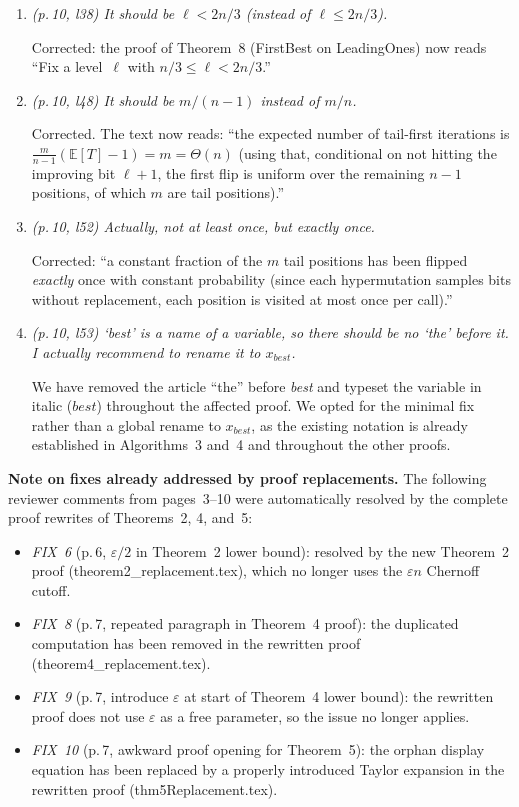 \documentclass[11pt]{article}
\newcommand{\RC}[1]{\textcolor{revcolor}{\textit{#1}}}
\newcommand{\resp}[1]{\smallskip\noindent #1\medskip}
\begin{document}
\begin{enumerate}[label=\textbf{P\arabic*.},leftmargin=*]
\item \RC{(p.\,10, l38) It should be $\ell<2n/3$ (instead of $\ell\le 2n/3$).}

\resp{Corrected: the proof of Theorem~8 (FirstBest on LeadingOnes) now reads
``Fix a level~$\ell$ with $n/3\le \ell < 2n/3$.''}

\item \RC{(p.\,10, l48) It should be $m/(n-1)$ instead of $m/n$.}

\resp{Corrected. The text now reads: ``the expected number of tail-first
iterations is $\frac{m}{n-1}(\mathbb{E}[T]-1) = m = \Theta(n)$ (using that,
conditional on not hitting the improving bit $\ell+1$, the first flip is
uniform over the remaining $n-1$ positions, of which $m$ are tail
positions).''}

\item \RC{(p.\,10, l52) Actually, not \emph{at least} once, but
\emph{exactly} once.}

\resp{Corrected: ``a constant fraction of the $m$ tail positions has been
flipped \emph{exactly} once with constant probability (since each
hypermutation samples bits without replacement, each position is visited at
most once per call).''}

\item \RC{(p.\,10, l53) `best' is a name of a variable, so there should be no
`the' before it. I actually recommend to rename it to $x_{\mathit{best}}$.}

\resp{We have removed the article ``the'' before \emph{best} and typeset the
variable in italic ($\mathit{best}$) throughout the affected proof.
We opted for the minimal fix rather than a global rename to
$x_{\mathit{best}}$, as the existing notation is already established in
Algorithms~3 and~4 and throughout the other proofs.}

\end{enumerate}

\medskip
\noindent\textbf{Note on fixes already addressed by proof replacements.}\quad
The following reviewer comments from pages~3--10 were automatically resolved
by the complete proof rewrites of Theorems~2, 4, and~5:
\begin{itemize}[nosep]
\item \emph{FIX~6} (p.\,6, $\varepsilon/2$ in Theorem~2 lower bound):
  resolved by the new Theorem~2 proof (theorem2\_replacement.tex), which no
  longer uses the $\varepsilon n$ Chernoff cutoff.
\item \emph{FIX~8} (p.\,7, repeated paragraph in Theorem~4 proof): the
  duplicated computation has been removed in the rewritten proof
  (theorem4\_replacement.tex).
\item \emph{FIX~9} (p.\,7, introduce $\varepsilon$ at start of Theorem~4
  lower bound): the rewritten proof does not use $\varepsilon$ as a free
  parameter, so the issue no longer applies.
\item \emph{FIX~10} (p.\,7, awkward proof opening for Theorem~5): the orphan
  display equation has been replaced by a properly introduced Taylor expansion
  in the rewritten proof (thm5Replacement.tex).
\end{itemize}
\end{document}
